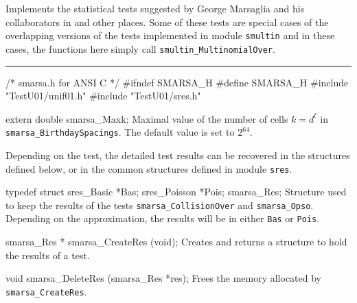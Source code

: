 
Implements the statistical tests suggested by George Marsaglia and his
collaborators in \cite{rMAR85a} and other places.
Some of these tests are special cases of the overlapping versions of the
tests implemented in module {\tt smultin} and in these cases, the
functions here simply call  {\tt smultin\_MultinomialOver}.
\resdef



\iffalse  %
For all these tests, when $N>1$, we may apply a two-level test
over the  $N$ $p$-values obtained at the first level.
For $N=1$, we simply compute the $p$-value of the first level test;
$n$ is the sample size of the first level test.
We also drop the first $r$ bits (the most significant,
$r \ge 0$) of each generated random number and apply the tests on
 the remaining bits.
\fi  %

\bigskip\hrule

\code\hide
/* smarsa.h for ANSI C */
#ifndef SMARSA_H
#define SMARSA_H
\endhide
#include "TestU01/unif01.h"
#include "TestU01/sres.h"
\endcode

\ifdetailed  %


\code

extern double smarsa_Maxk;
\endcode
\tab
   Maximal value of the number of cells $k = d^t$ in
   {\tt smarsa\_BirthdaySpacings}.
   The default value is set to $2^{64}$.
\endtab




Depending on the test, the detailed test results can be recovered in the
structures defined below, or in the common structures defined in module
 {\tt sres}.

\code

typedef struct {
   sres_Basic *Bas;
   sres_Poisson *Pois;
} smarsa_Res;
\endcode
 \tab
  Structure used to keep the results of the tests
  {\tt smarsa\_CollisionOver} and  {\tt smarsa\_Opso}.
  Depending on the approximation, the results will be in either {\tt Bas}
  or  {\tt Pois}.
 \endtab
\code


smarsa_Res * smarsa_CreateRes (void);
\endcode
 \tab
  Creates and returns a structure to hold the results of a test.
 \endtab
\code


void smarsa_DeleteRes (smarsa_Res *res);
\endcode
 \tab
  Frees the memory allocated by {\tt smarsa\_CreateRes}.
 \endtab

